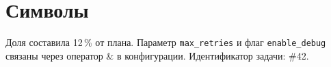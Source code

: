 \section{Символы}
Доля составила 12\,\% от плана.
Параметр \texttt{max\_retries} и флаг \texttt{enable\_debug}
связаны через оператор \& в конфигурации.
Идентификатор задачи: \#42.
